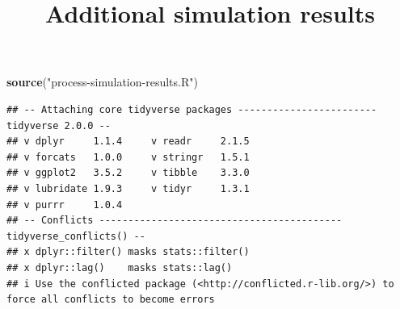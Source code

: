 \documentclass[
]{article}
\title{Additional simulation results}
\author{}
\date{\vspace{-2.5em}}
\newenvironment{Shaded}{\begin{snugshade}}{\end{snugshade}}
\newcommand{\AttributeTok}[1]{\textcolor[rgb]{0.13,0.29,0.53}{#1}}
\newcommand{\FunctionTok}[1]{\textcolor[rgb]{0.13,0.29,0.53}{\textbf{#1}}}
\newcommand{\NormalTok}[1]{#1}
\newcommand{\OtherTok}[1]{\textcolor[rgb]{0.56,0.35,0.01}{#1}}
\newcommand{\SpecialCharTok}[1]{\textcolor[rgb]{0.81,0.36,0.00}{\textbf{#1}}}
\newcommand{\StringTok}[1]{\textcolor[rgb]{0.31,0.60,0.02}{#1}}
\begin{document}
\maketitle

\begin{Shaded}
\begin{Highlighting}[]
\FunctionTok{source}\NormalTok{(}\StringTok{"process{-}simulation{-}results.R"}\NormalTok{)}
\end{Highlighting}
\end{Shaded}

\begin{verbatim}
## -- Attaching core tidyverse packages ------------------------ tidyverse 2.0.0 --
## v dplyr     1.1.4     v readr     2.1.5
## v forcats   1.0.0     v stringr   1.5.1
## v ggplot2   3.5.2     v tibble    3.3.0
## v lubridate 1.9.3     v tidyr     1.3.1
## v purrr     1.0.4     
## -- Conflicts ------------------------------------------ tidyverse_conflicts() --
## x dplyr::filter() masks stats::filter()
## x dplyr::lag()    masks stats::lag()
## i Use the conflicted package (<http://conflicted.r-lib.org/>) to force all conflicts to become errors
\end{verbatim}

\begin{Shaded}
\end{Shaded}
\end{document}
